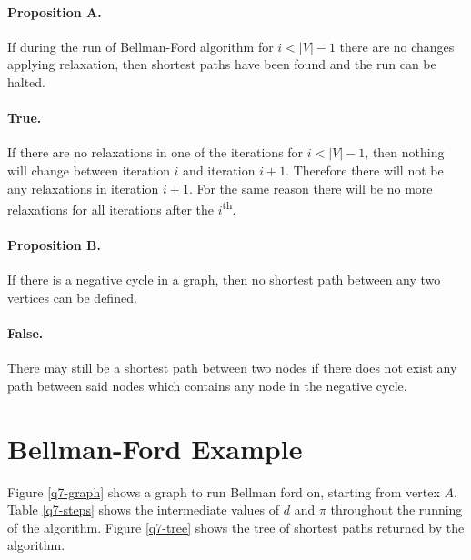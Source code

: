 \documentclass{article}
\begin{document}
\paragraph{Proposition A.} If during the run of Bellman-Ford algorithm for \(i < |V| - 1\) there are no changes applying relaxation, then shortest paths have been found and the run can be halted.

\paragraph{True.} If there are no relaxations in one of the iterations for \(i < |V| - 1\), then nothing will change between iteration \(i\) and iteration \(i+1\). Therefore there will not be any relaxations in iteration \(i+1\). For the same reason there will be no more relaxations for all iterations after the \(i\)\textsuperscript{th}.

\paragraph{Proposition B.} If there is a negative cycle in a graph, then no shortest path between any two vertices can be defined.

\paragraph{False.} There may still be a shortest path between two nodes if there does not exist any path between said nodes which contains any node in the negative cycle.

\section{Bellman-Ford Example}

Figure \ref{q7-graph} shows a graph to run Bellman ford on, starting from vertex \(A\). Table \ref{q7-steps} shows the intermediate values of \(d\) and \(\pi\) throughout the running of the algorithm. Figure \ref{q7-tree} shows the tree of shortest paths returned by the algorithm.
\end{document}
